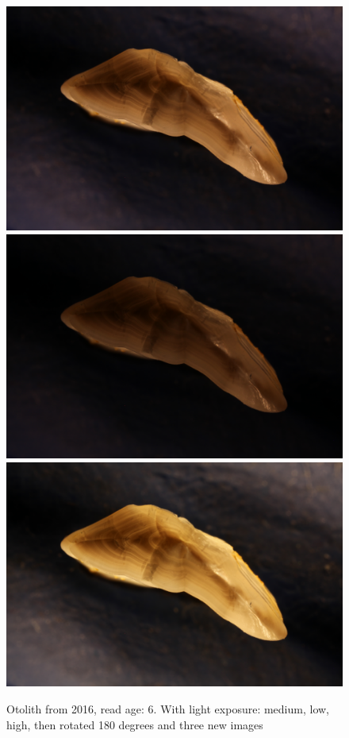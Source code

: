 \documentclass[10pt,letterpaper]{article}
\begin{document}
\begin{figure}[h!]
  \caption{Otolith from 2016, read age: 6. With light exposure: medium, low, high, 
  then rotated 180 degrees and three new images}
  \centering
  \includegraphics[scale=0.015]{otolith/IMG_0457_2016_70021.JPG}
  \includegraphics[scale=0.015]{otolith/IMG_0458_2016_70021.JPG}
  \includegraphics[scale=0.015]{otolith/IMG_0459_2016_70021.JPG} 


\end{figure}
\end{document}
